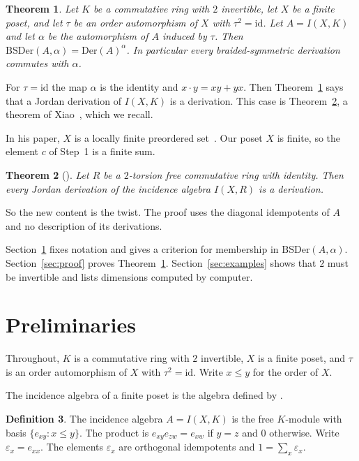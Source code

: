 \documentclass[]{interact}
\theoremstyle{plain}
\newtheorem{theorem}{Theorem}[section]
\theoremstyle{definition}
\newtheorem{definition}[theorem]{Definition}
\theoremstyle{remark}
\newcommand{\Der}{\mathrm{Der}}
\newcommand{\BSDer}{\mathrm{BSDer}}
\begin{document}
\begin{theorem}\label{thm:main} %
Let $K$ be a commutative ring with $2$ invertible, let $X$ be a finite poset, and let $\tau$ be an order automorphism of $X$ with $\tau^2 = \mathrm{id}$.
Let $A = I(X,K)$ and let $\alpha$ be the automorphism of $A$ induced by $\tau$.
Then $\BSDer(A,\alpha) = \Der(A)^\alpha$.
In particular every braided-symmetric derivation commutes with $\alpha$.
\end{theorem}

For $\tau = \mathrm{id}$ the map $\alpha$ is the identity and $x \cdot y = xy + yx$.
Then Theorem~\ref{thm:main} says that a Jordan derivation of $I(X,K)$ is a derivation.
This case is Theorem~\ref{thm:xiao}, a theorem of Xiao~\cite[Theorem 3.3]{Xiao2015}, which we recall.

In his paper, $X$ is a locally finite preordered set~\cite[p.~1357]{Xiao2015}.
Our poset $X$ is finite, so the element $c$ of Step~1 is a finite sum.

\begin{theorem}[{\cite[Theorem 3.3]{Xiao2015}}]\label{thm:xiao}
Let $R$ be a $2$-torsion free commutative ring with identity.
Then every Jordan derivation of the incidence algebra $I(X, R)$ is a derivation.
\end{theorem}

So the new content is the twist.
The proof uses the diagonal idempotents of $A$ and no description of its derivations. %

Section~\ref{sec:prelim} fixes notation and gives a criterion for membership in $\BSDer(A,\alpha)$.
Section~\ref{sec:proof} proves Theorem~\ref{thm:main}.
Section~\ref{sec:examples} shows that $2$ must be invertible and lists dimensions computed by computer.

\section{Preliminaries}\label{sec:prelim}

Throughout, $K$ is a commutative ring with $2$ invertible, $X$ is a finite poset, and $\tau$ is an order automorphism of $X$ with $\tau^2 = \mathrm{id}$.
Write $x \le y$ for the order of $X$.

The incidence algebra of a finite poset is the algebra defined by \citet[p.~1357]{Xiao2015}.

\begin{definition}\label{def:incidence}
The incidence algebra $A = I(X,K)$ is the free $K$-module with basis $\{e_{xy} : x \le y\}$.
The product is $e_{xy}e_{zw} = e_{xw}$ if $y = z$ and $0$ otherwise.
Write $\varepsilon_x = e_{xx}$.
The elements $\varepsilon_x$ are orthogonal idempotents and $1 = \sum_x \varepsilon_x$.
\end{definition}
\end{document}
